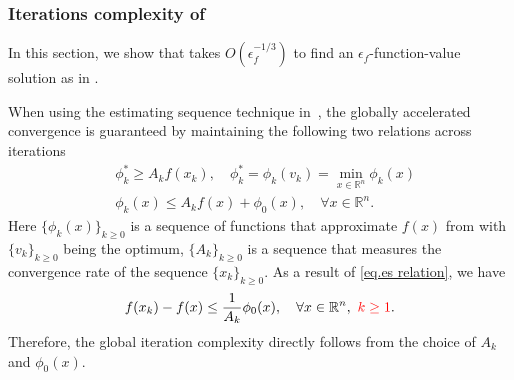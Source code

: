 \documentclass[moor,sglanonrev]{informs4}
\begin{document}
\subsubsection{Iterations complexity of }
In this section, we show that  takes $O(\epsilon_f^{-1/3})$ to find an $\epsilon_f$-function-value solution as in .

When using the estimating sequence technique in~\cite{nesterov2008accelerating}, the globally accelerated convergence is guaranteed by maintaining the following two relations across iterations
\begin{subequations}\label{eq.es relation}
    \begin{align}
        \label{eq.es relation 1}
         & \phi_k^*  \geq A_k f(x_k), \quad  \phi_k^*= \phi_k(v_k) =\min_{x\in\mathbb{R}^n}\phi_k(x) \\
        \label{eq.es relation 2}
         & \phi_k(x)\leq A_kf(x)+\phi_0(x), \quad \forall x\in\mathbb{R}^n.
    \end{align}
\end{subequations}
Here $\{\phi_k(x)\}_{k\geq 0}$ is a sequence of functions that approximate $f(x)$ from with $\{v_k\}_{k\geq0}$ being the optimum, $\{A_k\}_{k\geq 0}$ is a sequence that measures the convergence rate of the sequence $\{x_k\}_{k\geq 0}$. As a result of \eqref{eq.es relation}, we have
\begin{equation*}
    f(x_k)-f(x)\leq \frac{1}{A_k}\phi_0(x),\quad \forall x\in \mathbb{R}^n, \ {\color{red} k\geq 1}.
\end{equation*}
Therefore, the global iteration complexity directly follows from the choice of $A_k$ and $\phi_0(x)$.
\end{document}
